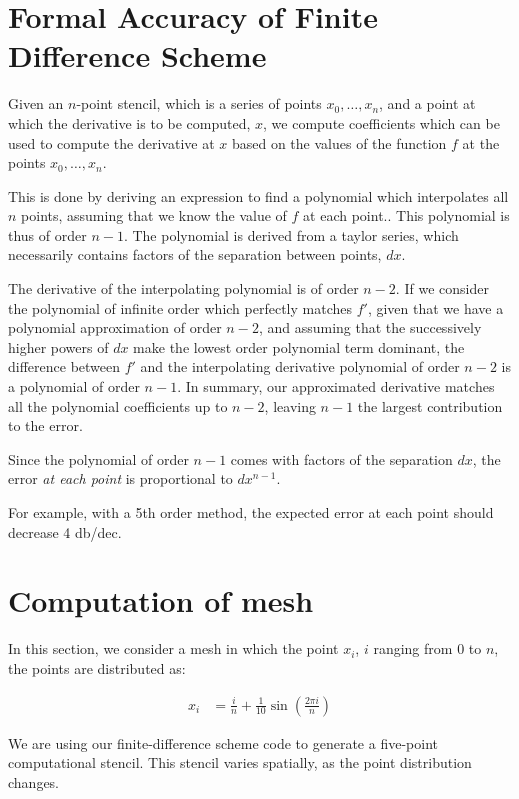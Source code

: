 \documentclass{article}
\begin{document}
\section{Formal Accuracy of Finite Difference Scheme}

Given an $n$-point stencil, which is a series of points 
	$x_0, \dots, x_n$, 
	and a point at which the derivative is to be computed,
	$x$, we compute coefficients which can be used to compute
	the derivative at $x$ based on the values of the function
	$f$ at the points $x_0, \dots, x_n$.

This is done by deriving an expression to find a polynomial
	which interpolates all $n$ points, assuming that we know
	the value of $f$ at each point..
This polynomial is thus of order $n-1$.
The polynomial is derived from a taylor series, which 
	necessarily contains factors of the separation between
	points, $dx$.

The derivative of the interpolating polynomial is of order
	$n-2$.
If we consider the polynomial of infinite order which perfectly
	matches $f'$, given that we have a polynomial approximation
	of order $n-2$, and assuming that the successively
	higher powers of $dx$ make the lowest order polynomial
	term dominant, the difference between $f'$ and the interpolating
	derivative polynomial of order $n-2$ is a polynomial of 
	order $n-1$.
In summary, our approximated derivative matches all the polynomial
	coefficients up to $n-2$, leaving $n-1$ the largest
	contribution to the error.

Since the polynomial of order $n-1$ comes with factors of 
	the separation $dx$, the error \emph{at each point}
	is proportional to $dx^{n-1}$.

For example, with a 5th order method, the expected error 
	at each point should decrease 4 db/dec.


\section{Computation of mesh}

In this section, we consider a mesh in which the point $x_i$, 
	$i$ ranging from $0$ to $n$, the points are distributed as:

\begin{align}
x_i & = \frac{i}{n} + \frac{1}{10} \sin \left( \frac{2 \pi i}{n} \right)
\end{align}

We are using our finite-difference scheme code to generate a five-point
	computational stencil.
This stencil varies spatially, as the point distribution changes.
\end{document}
